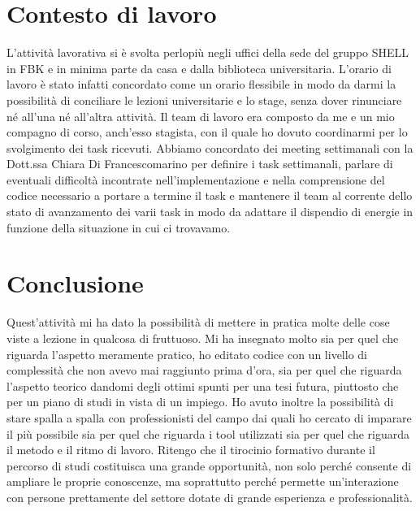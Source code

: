 \documentclass[11pt]{article} %
\begin{document}
\section{Contesto di lavoro}
L'attività lavorativa si è svolta perlopiù negli uffici della sede del gruppo SHELL in FBK e in minima parte da casa e dalla biblioteca universitaria. L'orario di lavoro è stato infatti concordato come un orario flessibile in modo da darmi la possibilità di conciliare le lezioni universitarie e lo stage, senza dover rinunciare né all'una né all'altra attività.
Il team di lavoro era composto da me e un mio compagno di corso, anch'esso stagista, con il quale ho dovuto coordinarmi per lo svolgimento dei task ricevuti. Abbiamo concordato dei meeting settimanali con la Dott.ssa Chiara Di Francescomarino per definire i task settimanali, parlare di eventuali difficoltà incontrate nell'implementazione e nella comprensione del codice necessario a portare a termine il task e mantenere il team al corrente dello stato di avanzamento dei varii task in modo da adattare il dispendio di energie in funzione della situazione in cui ci trovavamo.

\section{Conclusione}
Quest'attività mi ha dato la possibilità di mettere in pratica molte delle cose viste a lezione in qualcosa di fruttuoso. Mi ha insegnato molto sia per quel che riguarda l'aspetto meramente pratico, ho editato codice con un livello di complessità che non avevo mai raggiunto prima d'ora, sia per quel che riguarda l'aspetto teorico dandomi degli ottimi spunti per una tesi futura, piuttosto che per un piano di studi in vista di un impiego. Ho avuto inoltre la possibilità di stare spalla a spalla con professionisti del campo dai quali ho cercato di imparare il più possibile sia per quel che riguarda i tool utilizzati sia per quel che riguarda il metodo e il ritmo di lavoro. 
Ritengo che il tirocinio formativo durante il percorso di studi costituisca una grande opportunità, non solo perché consente di ampliare le proprie conoscenze, ma soprattutto perché permette un'interazione con persone prettamente del settore dotate di grande esperienza e professionalità.
\end{document}
